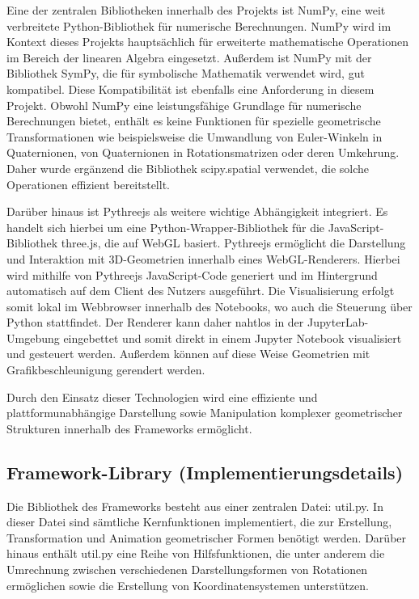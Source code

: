 Eine der zentralen Bibliotheken innerhalb des Projekts ist NumPy, eine weit verbreitete Python-Bibliothek für numerische Berechnungen.
NumPy wird im Kontext dieses Projekts hauptsächlich für erweiterte mathematische Operationen im Bereich der linearen Algebra eingesetzt.
Außerdem ist NumPy mit der Bibliothek SymPy, die für symbolische Mathematik verwendet wird, gut kompatibel.
Diese Kompatibilität ist ebenfalls eine Anforderung in diesem Projekt.
Obwohl NumPy eine leistungsfähige Grundlage für numerische Berechnungen bietet,
enthält es keine Funktionen für spezielle geometrische Transformationen wie beispielsweise die Umwandlung von Euler-Winkeln in Quaternionen,
von Quaternionen in Rotationsmatrizen oder deren Umkehrung.
Daher wurde ergänzend die Bibliothek scipy.spatial verwendet, die solche Operationen effizient bereitstellt.


Darüber hinaus ist Pythreejs als weitere wichtige Abhängigkeit integriert.
Es handelt sich hierbei um eine Python-Wrapper-Bibliothek für die JavaScript-Bibliothek three.js, die auf WebGL basiert.
Pythreejs ermöglicht die Darstellung und Interaktion mit 3D-Geometrien innerhalb eines WebGL-Renderers.
Hierbei wird mithilfe von Pythreejs JavaScript-Code generiert und im Hintergrund automatisch auf dem Client des Nutzers ausgeführt.
Die Visualisierung erfolgt somit lokal im Webbrowser innerhalb des Notebooks, wo auch die Steuerung über Python stattfindet.
Der Renderer kann daher nahtlos in der JupyterLab-Umgebung eingebettet und somit direkt in einem Jupyter Notebook visualisiert und gesteuert werden.
Außerdem können auf diese Weise Geometrien mit Grafikbeschleunigung gerendert werden. 

Durch den Einsatz dieser Technologien wird eine effiziente und platt\-form\-un\-ab\-hängige Darstellung sowie Manipulation komplexer
geometrischer Strukturen innerhalb des Frameworks ermöglicht.




\subsection{Framework-Library (Implementierungsdetails)}
Die Bibliothek des Frameworks besteht aus einer zentralen Datei: util.py.
In dieser Datei sind sämtliche Kernfunktionen implementiert, die zur Erstellung, Transformation und Animation geometrischer Formen benötigt werden.
Darüber hinaus enthält util.py eine Reihe von Hilfsfunktionen,
die unter anderem die Umrechnung zwischen verschiedenen Darstellungsformen von Rotationen ermöglichen sowie die Erstellung von Koordinatensystemen unterstützen.

